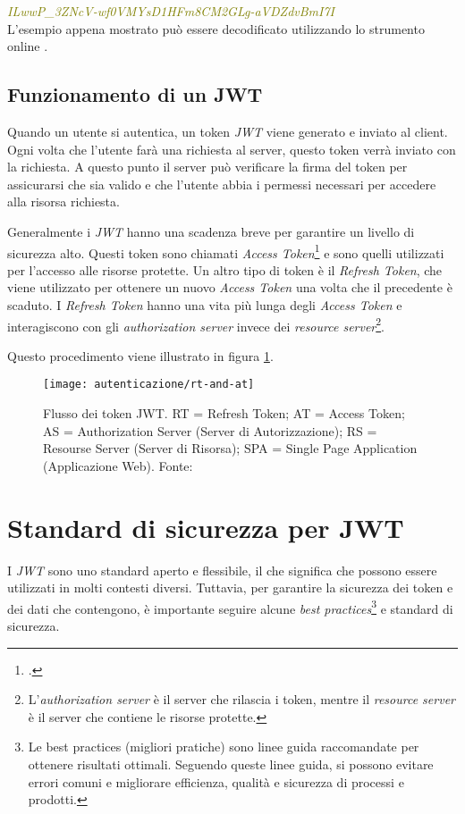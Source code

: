 \noindent \emph{\textcolor{olive}{ILwwP\_3ZNcV-wf0VMYsD1HFm8CM2GLg-aVDZdvBmI7I}}\\

L'esempio appena mostrato può essere decodificato utilizzando lo strumento online \cite{site:jwt-debugger}.


\subsection{Funzionamento di un JWT}
Quando un utente si autentica, un token \emph{JWT} viene generato e inviato al client.
Ogni volta che l'utente farà una richiesta al server, questo token verrà inviato con la richiesta.
A questo punto il server può verificare la firma del token per assicurarsi che sia valido e che l'utente abbia i permessi necessari per accedere alla risorsa richiesta.

Generalmente i \emph{JWT} hanno una scadenza breve per garantire un livello di sicurezza alto.
Questi token sono chiamati \emph{Access Token}\footcite{site:rfc6749} e sono quelli utilizzati per l'accesso alle risorse protette.
Un altro tipo di token è il \emph{Refresh Token}, che viene utilizzato per ottenere un nuovo \emph{Access Token} una volta che il precedente è scaduto.
I \emph{Refresh Token} hanno una vita più lunga degli \emph{Access Token} e interagiscono con gli \emph{authorization server} invece dei \emph{resource server}\footnote{L'\emph{authorization server} è il server che rilascia i token, mentre il \emph{resource server} è il server che contiene le risorse protette.}.

\noindent Questo procedimento viene illustrato in figura \ref{fig:jwt-flow}.

\begin{figure}[!ht] 
    \centering 
    \texttt{[image: autenticazione/rt-and-at]} 
    \caption{Flusso dei token JWT. RT = Refresh Token; AT = Access Token; AS = Authorization Server (Server di Autorizzazione); RS = Resourse Server (Server di Risorsa); SPA = Single Page Application (Applicazione Web). Fonte: \cite{site:jwt-flow}}
	\label{fig:jwt-flow}
\end{figure}

\section{Standard di sicurezza per JWT}
I \emph{JWT} sono uno standard aperto e flessibile, il che significa che possono essere utilizzati in molti contesti diversi.
Tuttavia, per garantire la sicurezza dei token e dei dati che contengono, è importante seguire alcune \emph{best practices}\footnote{Le best practices (migliori pratiche) sono linee guida raccomandate per ottenere risultati ottimali. Seguendo queste linee guida, si possono evitare errori comuni e migliorare efficienza, qualità e sicurezza di processi e prodotti.} e standard di sicurezza.

